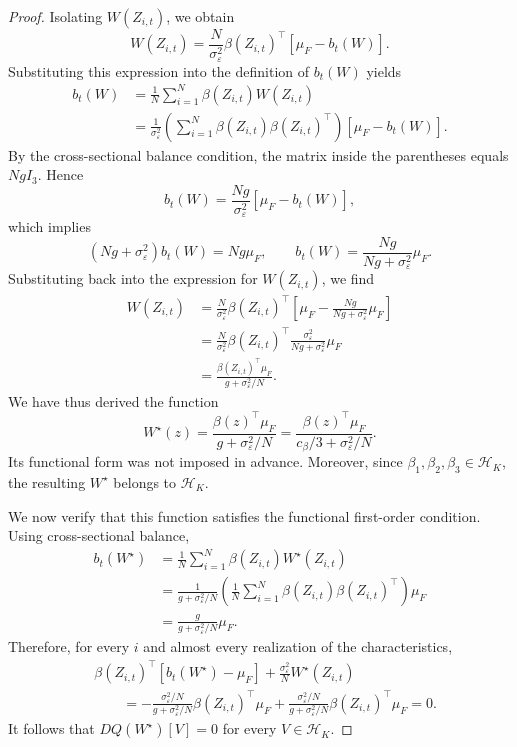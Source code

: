 \begin{proof}
Isolating $W(Z_{i,t})$, we obtain
\[
W(Z_{i,t})=\frac{N}{\sigma_\varepsilon^2}\beta(Z_{i,t})^\top[\mu_F-b_t(W)].
\]
Substituting this expression into the definition of $b_t(W)$ yields
\[
\begin{aligned}
b_t(W)
&=\frac1N\sum_{i=1}^N\beta(Z_{i,t})W(Z_{i,t})\\
&=\frac1{\sigma_\varepsilon^2}
\left(\sum_{i=1}^N\beta(Z_{i,t})\beta(Z_{i,t})^\top\right)
[\mu_F-b_t(W)].
\end{aligned}
\]
By the cross-sectional balance condition, the matrix inside the parentheses equals $NgI_3$. Hence
\[
b_t(W)=\frac{Ng}{\sigma_\varepsilon^2}[\mu_F-b_t(W)],
\]
which implies
\[
(Ng+\sigma_\varepsilon^2)b_t(W)=Ng\mu_F,
\qquad
b_t(W)=\frac{Ng}{Ng+\sigma_\varepsilon^2}\mu_F.
\]
Substituting back into the expression for $W(Z_{i,t})$, we find
\[
\begin{aligned}
W(Z_{i,t})
&=\frac{N}{\sigma_\varepsilon^2}\beta(Z_{i,t})^\top
\left[\mu_F-\frac{Ng}{Ng+\sigma_\varepsilon^2}\mu_F\right]\\
&=\frac{N}{\sigma_\varepsilon^2}\beta(Z_{i,t})^\top
\frac{\sigma_\varepsilon^2}{Ng+\sigma_\varepsilon^2}\mu_F\\
&=\frac{\beta(Z_{i,t})^\top\mu_F}{g+\sigma_\varepsilon^2/N}.
\end{aligned}
\]
We have thus derived the function
\[
W^\star(z)=\frac{\beta(z)^\top\mu_F}{g+\sigma_\varepsilon^2/N}
=\frac{\beta(z)^\top\mu_F}{c_\beta/3+\sigma_\varepsilon^2/N}.
\]
Its functional form was not imposed in advance. Moreover, since $\beta_1,\beta_2,\beta_3\in\mathcal H_K$, the resulting $W^\star$ belongs to $\mathcal H_K$.

We now verify that this function satisfies the functional first-order condition. Using cross-sectional balance,
\[
\begin{aligned}
b_t(W^\star)
&=\frac1N\sum_{i=1}^N\beta(Z_{i,t})W^\star(Z_{i,t})\\
&=\frac1{g+\sigma_\varepsilon^2/N}
\left(\frac1N\sum_{i=1}^N\beta(Z_{i,t})\beta(Z_{i,t})^\top\right)\mu_F\\
&=\frac{g}{g+\sigma_\varepsilon^2/N}\mu_F.
\end{aligned}
\]
Therefore, for every $i$ and almost every realization of the characteristics,
\[
\begin{aligned}
&\beta(Z_{i,t})^\top[b_t(W^\star)-\mu_F]
+\frac{\sigma_\varepsilon^2}{N}W^\star(Z_{i,t})\\
&\qquad=
-\frac{\sigma_\varepsilon^2/N}{g+\sigma_\varepsilon^2/N}
\beta(Z_{i,t})^\top\mu_F
+\frac{\sigma_\varepsilon^2/N}{g+\sigma_\varepsilon^2/N}
\beta(Z_{i,t})^\top\mu_F=0.
\end{aligned}
\]
It follows that $DQ(W^\star)[V]=0$ for every $V\in\mathcal H_K$.


\end{proof}
